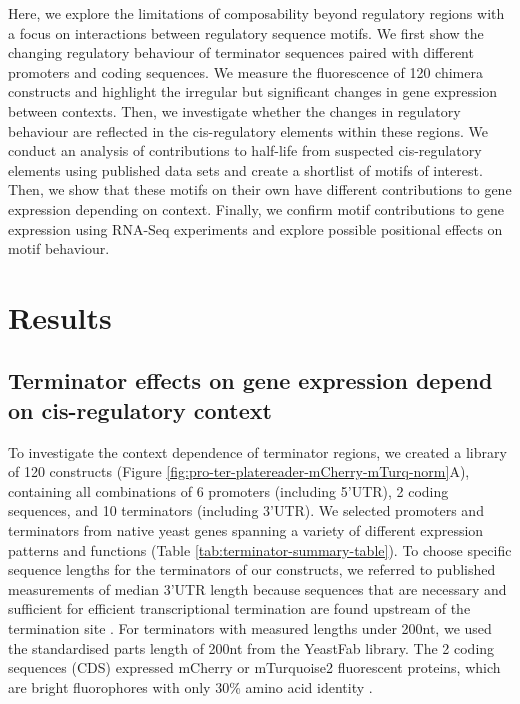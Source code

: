 \documentclass[../main.tex]{subfiles}
\begin{document}
Here, we explore the limitations of composability beyond regulatory regions with a focus on interactions between regulatory sequence motifs.
We first show the changing regulatory behaviour of terminator sequences paired with different promoters and coding sequences.
We measure the fluorescence of 120 chimera constructs and highlight the irregular but significant changes in gene expression between contexts. 
Then, we investigate whether the changes in regulatory behaviour are reflected in the cis-regulatory elements within these regions. 
We conduct an analysis of contributions to half-life from suspected cis-regulatory elements using published data sets and create a shortlist of motifs of interest.
Then, we show that these motifs on their own have different contributions to gene expression depending on context. 
Finally, we confirm motif contributions to gene expression using RNA-Seq experiments and explore possible positional effects on motif behaviour. 
 
\section{Results}

\subsection{Terminator effects on gene expression depend on cis-regulatory context}

To investigate the context dependence of terminator regions, we created a library of 120 constructs (Figure \ref{fig:pro-ter-platereader-mCherry-mTurq-norm}A), containing all combinations of 6 promoters (including 5'UTR), 2 coding sequences, and 10 terminators (including 3'UTR).
We selected promoters and terminators from native yeast genes spanning a variety of different expression patterns and functions (Table \ref{tab:terminator-summary-table}).
To choose specific sequence lengths for the terminators of our constructs, we referred to published measurements of median 3'UTR length \parencite{Pelechano2013} because sequences that are necessary and sufficient for efficient transcriptional termination are found upstream of the termination site \parencite{Guo1996}.
For terminators with measured lengths under 200nt, we used the standardised parts length of 200nt from the YeastFab library.
The 2 coding sequences (CDS) expressed mCherry or mTurquoise2 fluorescent proteins, which are bright fluorophores with only 30\% amino acid identity \parencite{Shaner2004, Goedhart2012}.
\end{document}
